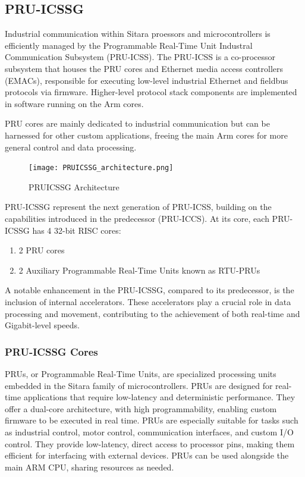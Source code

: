 \subsection{PRU-ICSSG}

Industrial communication within Sitara proessors and microcontrollers is
efficiently managed by the Programmable Real-Time Unit Industral Communication
Subsystem (PRU-ICSS). The PRU-ICSS is a co-processor subsystem that houses the
PRU cores and Ethernet media access controllers (EMACs), responsible for
executing low-level industrial Ethernet and fieldbus protocols via firmware.
Higher-level protocol stack components are implemented in software running on
the Arm cores.

PRU cores are mainly dedicated to industrial communication but can be harnessed
for other custom applications, freeing the main Arm cores for more general
control and data processing.

\begin{figure}[H]
    \centering
    \texttt{[image: PRUICSSG\_architecture.png]}
    \caption{PRUICSSG Architecture}
\end{figure}


PRU-ICSSG represent the next generation of PRU-ICSS, building on the
capabilities introduced in the predecessor (PRU-ICCS).
At its core, each PRU-ICSSG has 4 32-bit RISC cores:

\begin{enumerate}
    \item 2 PRU cores
    \item 2 Auxiliary Programmable Real-Time Units known as RTU-PRUs
\end{enumerate}


A notable enhancement in the PRU-ICSSG, compared to its predecessor, is the
inclusion of internal accelerators. These accelerators play a crucial role in
data processing and movement, contributing to the achievement of both real-time
and Gigabit-level speeds.

\subsubsection{PRU-ICSSG Cores}

PRUs, or Programmable Real-Time Units, are specialized processing units
embedded in the Sitara family of microcontrollers. PRUs are designed for
real-time applications that require low-latency and deterministic performance.
They offer a dual-core architecture, with high programmability, enabling custom
firmware to be executed in real time. PRUs are especially suitable for tasks
such as industrial control, motor control, communication interfaces, and custom
I/O control. They provide low-latency, direct access to processor pins, making
them efficient for interfacing with external devices. PRUs can be used
alongside the main ARM CPU, sharing resources as needed.


